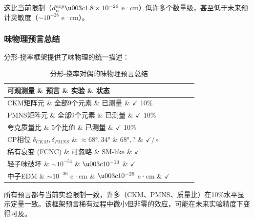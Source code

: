 这比当前限制（$d_n^{exp} \u003c 1.8 \times 10^{-26}$ e·cm）低许多个数量级，甚至低于未来预计灵敏度（$\sim 10^{-28}$ e·cm）。

\subsubsection{味物理预言总结}

分形-挠率框架提供了味物理的统一描述：

\begin{table}[h]
\centering
\begin{tabular}{p{4cm}ccc}
\hline
\textbf{可观测量} \& \textbf{预言} \& \textbf{实验} \& \textbf{状态} \\
\hline
CKM矩阵元 \& 全部9个元素 \& 已测量 \& $\checkmark$ 10\% \\
PMNS矩阵元 \& 全部9个元素 \& 已测量 \& $\checkmark$ 10\% \\
夸克质量比 \& 5个比值 \& 已测量 \& $\checkmark$ 10\% \\
CP相位 $\delta_{CKM}, \delta_{PMNS}$ \& $\approx 68°, 34°$ \& $68°, ?$ \& $\checkmark/\circ$ \\
稀有衰变 (FCNC) \& 可忽略 \& SM-like \& $\checkmark$ \\
轻子味破坏 \& $\sim 10^{-54}$ \& $\u003c 10^{-13}$ \& $\checkmark$ \\
中子EDM \& $\sim 10^{-36}$ e·cm \& $\u003c 10^{-26}$ e·cm \& $\checkmark$ \\
\hline
\end{tabular}
\caption{分形-挠率对偶的味物理预言总结}
\end{table}

所有预言都与当前实验限制一致，许多（CKM、PMNS、质量比）在10\%水平显示定量一致。该框架预言稀有过程中微小但非零的效应，可能在未来实验精度下变得可及。
